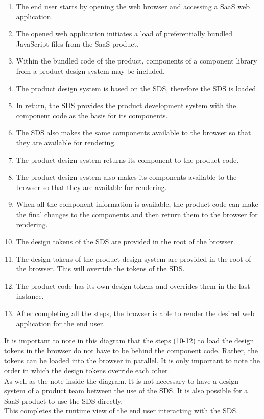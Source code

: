 \begin{enumerate}
    \item The end user starts by opening the web browser and accessing a SaaS web application. 
    \item The opened web application initiates a load of preferentially bundled JavaScript files from the SaaS product.
    \item  Within the bundled code of the product, components of a component library from a product design system may be included. 
    \item The product design system is based on the \acl{SDS}, therefore the \ac{SDS} is loaded.
    \item In return, the \ac{SDS} provides the product development system with the component code as the basis for its components.
    \item The \ac{SDS} also makes the same components available to the browser so that they are available for rendering.
    \item The product design system returns its component to the product code.
    \item The product design system also makes its components available to the browser so that they are available for rendering.
    \item When all the component information is available, the product code can make the final changes to the components and then return them to the browser for rendering.
    \item The design tokens of the \ac{SDS} are provided in the root of the browser.
    \item The design tokens of the product design system are provided in the root of the browser. This will override the tokens of the \ac{SDS}.
    \item The product code has its own design tokens and overrides them in the last instance.
    \item After completing all the steps, the browser is able to render the desired web application for the end user.
\end{enumerate}
It is important to note in this diagram that the steps (10-12) to load the design tokens in the browser do not have to be behind the component code. Rather, the tokens can be loaded into the browser in parallel. It is only important to note the order in which the design tokens override each other. \\
As well as the note inside the diagram. It is not necessary to have a design system of a product team between the use of the \ac{SDS}. It is also possible for a SaaS product to use the \ac{SDS} directly.\\
This completes the runtime view of the end user interacting with the SDS. 
